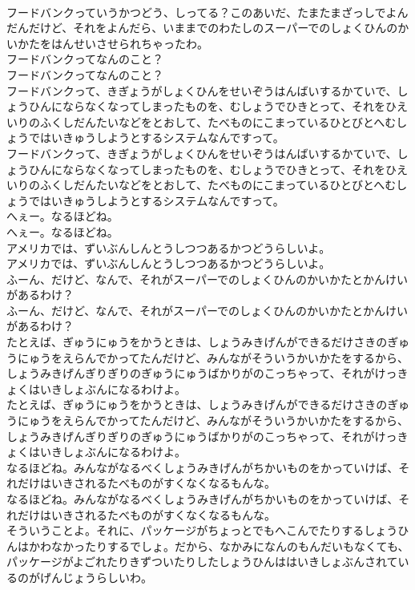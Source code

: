 \documentclass[8pt]{extreport}
\begin{document}
\begin{CJK}{UTF8}{min}
\\	フードバンクっていうかつどう、しってる？このあいだ、たまたまざっしでよんだんだけど、それをよんだら、いままでのわたしのスーパーでのしょくひんのかいかたをはんせいさせられちゃったわ。
\\	フードバンクってなんのこと？
\\	フードバンクってなんのこと？
\\	フードバンクって、きぎょうがしょくひんをせいぞうはんばいするかていで、しょうひんにならなくなってしまったものを、むしょうでひきとって、それをひえいりのふくしだんたいなどをとおして、たべものにこまっているひとびとへむしょうではいきゅうしようとするシステムなんですって。
\\	フードバンクって、きぎょうがしょくひんをせいぞうはんばいするかていで、しょうひんにならなくなってしまったものを、むしょうでひきとって、それをひえいりのふくしだんたいなどをとおして、たべものにこまっているひとびとへむしょうではいきゅうしようとするシステムなんですって。
\\	へぇー。なるほどね。
\\	へぇー。なるほどね。
\\	アメリカでは、ずいぶんしんとうしつつあるかつどうらしいよ。
\\	アメリカでは、ずいぶんしんとうしつつあるかつどうらしいよ。
\\	ふーん、だけど、なんで、それがスーパーでのしょくひんのかいかたとかんけいがあるわけ？
\\	ふーん、だけど、なんで、それがスーパーでのしょくひんのかいかたとかんけいがあるわけ？
\\	たとえば、ぎゅうにゅうをかうときは、しょうみきげんができるだけさきのぎゅうにゅうをえらんでかってたんだけど、みんながそういうかいかたをするから、しょうみきげんぎりぎりのぎゅうにゅうばかりがのこっちゃって、それがけっきょくはいきしょぶんになるわけよ。
\\	たとえば、ぎゅうにゅうをかうときは、しょうみきげんができるだけさきのぎゅうにゅうをえらんでかってたんだけど、みんながそういうかいかたをするから、しょうみきげんぎりぎりのぎゅうにゅうばかりがのこっちゃって、それがけっきょくはいきしょぶんになるわけよ。
\\	なるほどね。みんながなるべくしょうみきげんがちかいものをかっていけば、それだけはいきされるたべものがすくなくなるもんな。
\\	なるほどね。みんながなるべくしょうみきげんがちかいものをかっていけば、それだけはいきされるたべものがすくなくなるもんな。
\\	そういうことよ。それに、パッケージがちょっとでもへこんでたりするしょうひんはかわなかったりするでしょ。だから、なかみになんのもんだいもなくても、パッケージがよごれたりきずついたりしたしょうひんははいきしょぶんされているのがげんじょうらしいわ。

\end{CJK}
\end{document}

